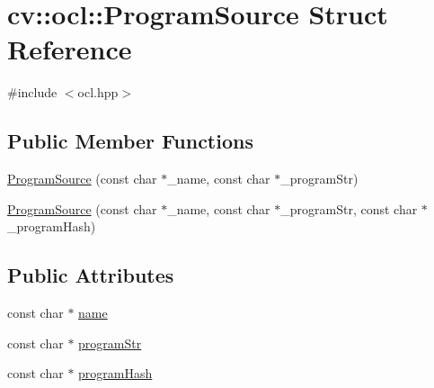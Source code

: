 \hypertarget{structcv_1_1ocl_1_1ProgramSource}{\section{cv\-:\-:ocl\-:\-:Program\-Source Struct Reference}
\label{structcv_1_1ocl_1_1ProgramSource}
}


{\ttfamily \#include $<$ocl.\-hpp$>$}

\subsection*{Public Member Functions}
\begin{DoxyCompactItemize}
\item 
\hyperlink{structcv_1_1ocl_1_1ProgramSource_a5b78e2be607281118641a003c3d38d5a}{Program\-Source} (const char $\ast$\-\_\-name, const char $\ast$\-\_\-program\-Str)
\item 
\hyperlink{structcv_1_1ocl_1_1ProgramSource_a524325fc5f20b401ab655965c5f4a53c}{Program\-Source} (const char $\ast$\-\_\-name, const char $\ast$\-\_\-program\-Str, const char $\ast$\-\_\-program\-Hash)
\end{DoxyCompactItemize}
\subsection*{Public Attributes}
\begin{DoxyCompactItemize}
\item 
const char $\ast$ \hyperlink{structcv_1_1ocl_1_1ProgramSource_a5594acd1689f16d68635ec3ded859a1a}{name}
\item 
const char $\ast$ \hyperlink{structcv_1_1ocl_1_1ProgramSource_a5fec696b43b01c9acf7ec9044a7d4aae}{program\-Str}
\item 
const char $\ast$ \hyperlink{structcv_1_1ocl_1_1ProgramSource_a2c8f26d71aafa233ed5977d050a236c1}{program\-Hash}
\end{DoxyCompactItemize}


